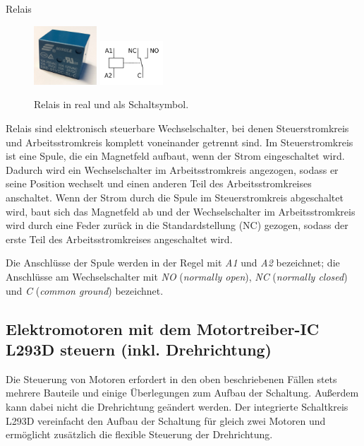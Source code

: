 \bigskip
\begin{zsfg}{Relais}
		\begin{figure}
		\vspace{-0.3\baselineskip}
		\centering
		\hfill
		\includegraphics[width=0.21\textwidth]{./pics/relais-klein.png}
		\hfill
		\includegraphics[width=0.21\textwidth]{./Zeichnungen/schaltsymbol-relais.png}
		\hfill
		\caption{Relais in real und als Schaltsymbol.}
	\end{figure}
	Relais sind elektronisch steuerbare Wechselschalter, bei denen Steuerstromkreis und Arbeitsstromkreis komplett voneinander getrennt sind. Im Steuerstromkreis ist eine Spule, die ein Magnetfeld aufbaut, wenn der Strom eingeschaltet wird. Dadurch wird ein Wechselschalter im Arbeitsstromkreis angezogen, sodass er seine Position wechselt und einen anderen Teil des Arbeitsstromkreises anschaltet. Wenn der Strom durch die Spule im Steuerstromkreis abgeschaltet wird, baut sich das Magnetfeld ab und der Wechselschalter im Arbeitsstromkreis wird durch eine Feder zurück in die Standardstellung (NC) gezogen, sodass der erste Teil des Arbeitsstromkreises angeschaltet wird.
	
	Die Anschlüsse der Spule werden in der Regel mit \emph{A1} und \emph{A2} bezeichnet; die Anschlüsse am Wechselschalter mit \emph{NO} (\emph{normally open}), \emph{NC} (\emph{normally closed}) und \emph{C} (\emph{common ground}) bezeichnet.
\end{zsfg}

\newpage
\subsection{Elektromotoren mit dem Motortreiber-IC L293D steuern (inkl. Drehrichtung)}

Die Steuerung von Motoren erfordert in den oben beschriebenen Fällen stets mehrere Bauteile und einige Überlegungen zum Aufbau der Schaltung. Außerdem kann dabei nicht die Drehrichtung geändert werden. Der integrierte Schaltkreis L293D vereinfacht den Aufbau der Schaltung für gleich zwei Motoren und ermöglicht zusätzlich die flexible Steuerung der Drehrichtung.

